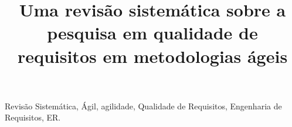 \documentclass[conference]{IEEEtran}
\begin{document}
\title{Uma revisão sistemática sobre a pesquisa em qualidade de requisitos em metodologias ágeis }


\author{
}

\maketitle



\begin{IEEEkeywords}
Revisão Sistemática, Ágil, agilidade, Qualidade de Requisitos, Engenharia de Requisitos, ER.
\end{IEEEkeywords}














\newpage


\end{document}
